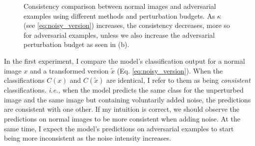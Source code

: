 \begin{figure}[htp]


    \caption{Consistency comparison between normal images and adversarial
        examples using different methods and perturbation budgets. As $\kappa$
        (see \eqref{eq:noisy_version}) increases, the consistency decreases,
        more so for adversarial examples, unless we also increase the
        adversarial perturbation budget as seen in (b).}
    \label{fig:consistency}
\end{figure}


In the first experiment, I compare the model's classification output for a
normal image $x$ and a transformed version $\tilde{x}$ (Eq.
\eqref{eq:noisy_version}). When the classifications $C(x)$ and $C(\tilde{x})$
are identical, I refer to them as being \emph{consistent} classifications.
\emph{i.e.,} when the model predicts the same class for the unperturbed image
and the same image but containing voluntarily added noise, the predictions are
consistent with one other. If my intuition is correct, we should observe the
predictions on normal images to be more consistent when adding noise. At the
same time, I expect the model's predictions on adversarial examples to start
being more inconsistent as the noise intensity increases.

